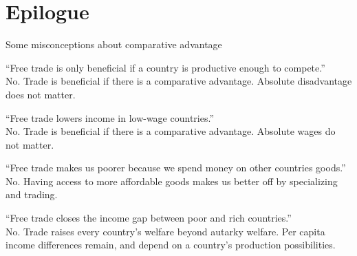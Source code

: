 \documentclass[notes,11pt, aspectratio=169, xcolor=table]{beamer}
\newenvironment{wideitemize}{\itemize\addtolength{\itemsep}{10pt}}{\enditemize}
\begin{document}
\section{Epilogue}

\begin{frame}{Some misconceptions about comparative advantage}
\begin{wideitemize}
    \item ``Free trade is only beneficial if a country is productive enough to compete.'' \\
    \qquad No. Trade is beneficial if there is a comparative advantage. Absolute disadvantage does not matter.

        \item ``Free trade lowers income in low-wage countries.'' \\
    \qquad No. Trade is beneficial if there is a comparative advantage. Absolute wages do not matter.

    \item ``Free trade makes us poorer because we spend money on other countries goods.'' \\
    \qquad No. Having access to more affordable goods makes us better off by specializing and trading.

    \item ``Free trade closes the income gap between poor and rich countries.'' \\
    \qquad No. Trade raises every country’s welfare beyond autarky welfare. Per capita
income differences remain, and depend on a country’s production possibilities.

\end{wideitemize}
    
\end{frame}
\end{document}
